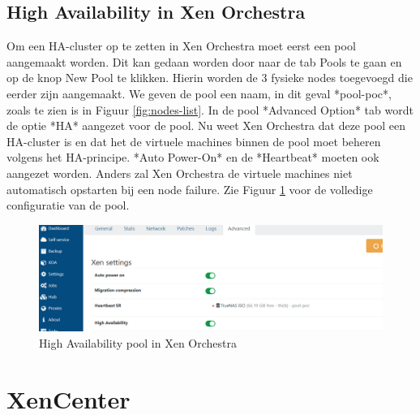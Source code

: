 \subsection{High Availability in Xen Orchestra}
\label{sec:ha-orch}
Om een HA-cluster op te zetten in Xen Orchestra moet eerst een pool aangemaakt worden.
Dit kan gedaan worden door naar de tab Pools te gaan en op de knop New Pool te klikken.
Hierin worden de 3 fysieke nodes toegevoegd die eerder zijn aangemaakt. We geven de pool een naam, in dit geval *pool-poc*, zoals te zien is in Figuur \ref{fig:nodes-list}.  
In de pool *Advanced Option* tab wordt de optie *HA* aangezet voor de pool. Nu weet Xen Orchestra dat deze pool een HA-cluster is en dat het de virtuele machines binnen de pool moet beheren volgens het HA-principe.  
*Auto Power-On* en de *Heartbeat* moeten ook aangezet worden. Anders zal Xen Orchestra de virtuele machines niet automatisch opstarten bij een node failure.  
Zie Figuur \ref{fig:ha-settings-orch.png} voor de volledige configuratie van de pool.

\begin{figure}[H]
  \centering
  \includegraphics[width=1.1\textwidth, trim=0cm 0cm 10cm 0cm, clip]{../poc/ha-settings-orch.png}
  \caption{High Availability pool in Xen Orchestra}
  \label{fig:ha-settings-orch.png}
\end{figure}

\section{XenCenter}%
